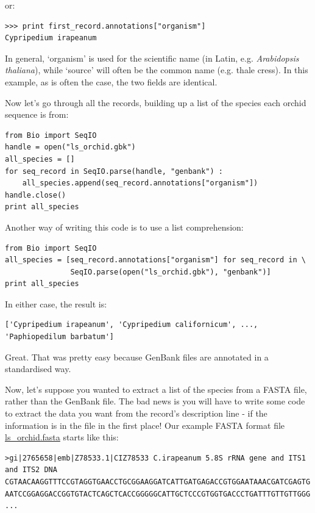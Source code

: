 \documentclass{report}
\begin{document}
\noindent or:

\begin{verbatim}
>>> print first_record.annotations["organism"]
Cypripedium irapeanum
\end{verbatim}

In general, `organism' is used for the scientific name (in Latin, e.g. \textit{Arabidopsis thaliana}),
while `source' will often be the common name (e.g. thale cress).  In this example, as is often the case,
the two fields are identical.  

Now let's go through all the records, building up a list of the species each orchid sequence is from:

\begin{verbatim}
from Bio import SeqIO
handle = open("ls_orchid.gbk")
all_species = []
for seq_record in SeqIO.parse(handle, "genbank") :
    all_species.append(seq_record.annotations["organism"])
handle.close()
print all_species
\end{verbatim}

Another way of writing this code is to use a list comprehension:

\begin{verbatim}
from Bio import SeqIO
all_species = [seq_record.annotations["organism"] for seq_record in \
               SeqIO.parse(open("ls_orchid.gbk"), "genbank")]
print all_species
\end{verbatim}

\noindent In either case, the result is:

\begin{verbatim}
['Cypripedium irapeanum', 'Cypripedium californicum', ..., 'Paphiopedilum barbatum']
\end{verbatim}

Great.  That was pretty easy because GenBank files are annotated in a standardised way.

Now, let's suppose you wanted to extract a list of the species from a FASTA file, rather than the GenBank file.  The bad news is you will have to write some code to extract the data you want from the record's description line - if the information is in the file in the first place!  Our example FASTA format file \href{http://biopython.org/DIST/docs/tutorial/examples/ls_orchid.fasta}{ls\_orchid.fasta} starts like this:

\begin{verbatim}
>gi|2765658|emb|Z78533.1|CIZ78533 C.irapeanum 5.8S rRNA gene and ITS1 and ITS2 DNA
CGTAACAAGGTTTCCGTAGGTGAACCTGCGGAAGGATCATTGATGAGACCGTGGAATAAACGATCGAGTG
AATCCGGAGGACCGGTGTACTCAGCTCACCGGGGGCATTGCTCCCGTGGTGACCCTGATTTGTTGTTGGG
...
\end{verbatim}
\end{document}
